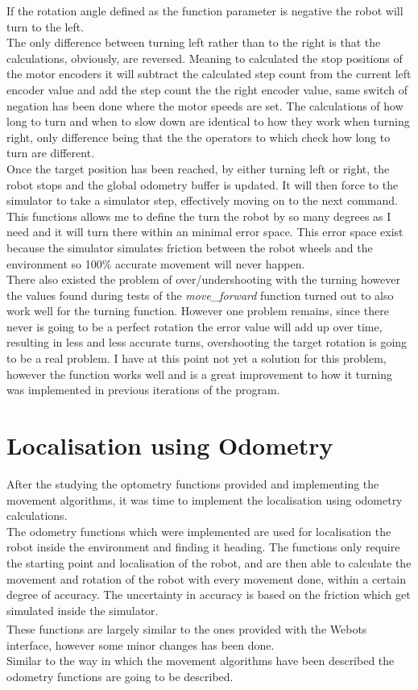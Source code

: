 If the rotation angle defined as the function parameter is negative the robot will turn to the left.\\
The only difference between turning left rather than to the right is that the calculations, obviously, are reversed. Meaning to calculated the stop positions of the motor encoders it will subtract the calculated step count from the current left encoder value and add the step count the the right
encoder value, same switch of negation has been done where the motor speeds are set.
The calculations of how long to turn and when to slow down are identical to how they work when turning right, only difference being that the the operators to which check how long to turn are different.\\
Once the target position has been reached, by either turning left or right, the robot stops and the global odometry buffer is updated. 
It will then force to the simulator to take a simulator step, effectively moving on to the next command.\\[3ex]

This functions allows me to define the turn the robot by so many degrees as I need and it will turn there within an minimal error space. This error space exist because the simulator simulates friction between the robot wheels and the environment so 100\% accurate movement will never happen.\\
There also existed the problem of over/undershooting with the turning however the values found during tests of the \textit{move\_forward} function turned out to also work well for the turning function. However one problem remains, since there never is going to be a perfect rotation the error value will add up over time, resulting in less and less accurate turns, overshooting the target rotation is going to be a real problem. I have at this point not yet a solution for this problem, however the function works well and is a great improvement to how it turning was implemented in previous iterations of the program.

\section{Localisation using Odometry}
After the studying the optometry functions provided and implementing the movement algorithms, it was time to implement the localisation using odometry calculations.\\
The odometry functions which were implemented are used for localisation the robot inside the environment and finding it heading. The functions only require the starting point and localisation of the robot, and are then able to calculate the movement and rotation of the robot with every movement done, within a certain degree of accuracy. The uncertainty in accuracy is based on the friction which get simulated inside the simulator. \\
These functions are largely similar to the ones provided with the Webots\textsuperscript{\texttrademark} interface, however some minor changes has been done. \\
Similar to the way in which the movement algorithms have been described the odometry functions are going to be described. 

